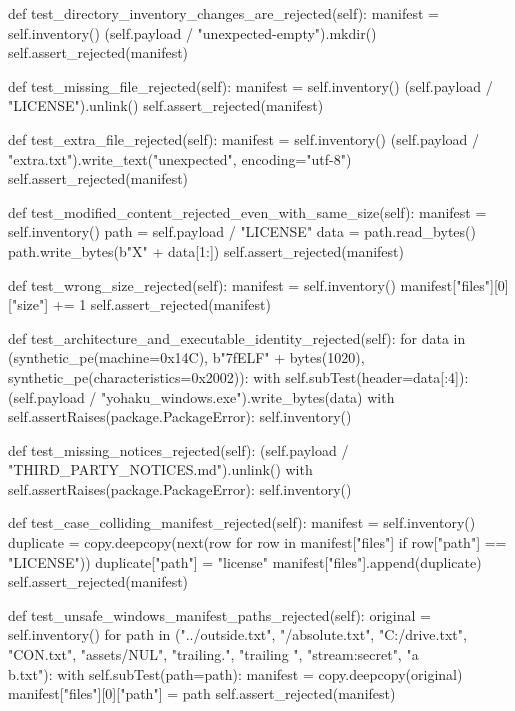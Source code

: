     def test_directory_inventory_changes_are_rejected(self):
        manifest = self.inventory()
        (self.payload / "unexpected-empty").mkdir()
        self.assert_rejected(manifest)

    def test_missing_file_rejected(self):
        manifest = self.inventory()
        (self.payload / "LICENSE").unlink()
        self.assert_rejected(manifest)

    def test_extra_file_rejected(self):
        manifest = self.inventory()
        (self.payload / "extra.txt").write_text("unexpected", encoding="utf-8")
        self.assert_rejected(manifest)

    def test_modified_content_rejected_even_with_same_size(self):
        manifest = self.inventory()
        path = self.payload / "LICENSE"
        data = path.read_bytes()
        path.write_bytes(b"X" + data[1:])
        self.assert_rejected(manifest)

    def test_wrong_size_rejected(self):
        manifest = self.inventory()
        manifest["files"][0]["size"] += 1
        self.assert_rejected(manifest)

    def test_architecture_and_executable_identity_rejected(self):
        for data in (synthetic_pe(machine=0x14C), b"\x7fELF" + bytes(1020),
                     synthetic_pe(characteristics=0x2002)):
            with self.subTest(header=data[:4]):
                (self.payload / "yohaku_windows.exe").write_bytes(data)
                with self.assertRaises(package.PackageError):
                    self.inventory()

    def test_missing_notices_rejected(self):
        (self.payload / "THIRD_PARTY_NOTICES.md").unlink()
        with self.assertRaises(package.PackageError):
            self.inventory()

    def test_case_colliding_manifest_rejected(self):
        manifest = self.inventory()
        duplicate = copy.deepcopy(next(row for row in manifest["files"] if row["path"] == "LICENSE"))
        duplicate["path"] = "license"
        manifest["files"].append(duplicate)
        self.assert_rejected(manifest)

    def test_unsafe_windows_manifest_paths_rejected(self):
        original = self.inventory()
        for path in ("../outside.txt", "/absolute.txt", "C:/drive.txt", "CON.txt",
                     "assets/NUL", "trailing.", "trailing ", "stream:secret", "a\\b.txt"):
            with self.subTest(path=path):
                manifest = copy.deepcopy(original)
                manifest["files"][0]["path"] = path
                self.assert_rejected(manifest)


